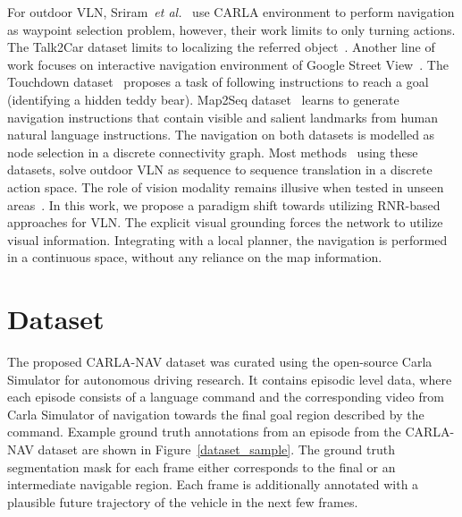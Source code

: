 \documentclass[11pt]{article}
\newcommand{\etal}{\textit{et al.}}
\begin{document}
For outdoor VLN, Sriram~\etal~\cite{sriram2019talk} use CARLA environment to perform navigation as waypoint selection problem, however, their work limits to only turning actions. The Talk2Car dataset limits to localizing the referred object~\cite{deruyttere2019talk2car}. Another line of work focuses on interactive navigation environment of Google Street View~\cite{mirowski2018learning}. The Touchdown dataset~\cite{chen2019touchdown} proposes a task of following instructions to reach a goal (identifying a hidden teddy bear). Map2Seq dataset~\cite{schumann2020generating} learns to generate navigation instructions that contain visible and salient landmarks from human natural language instructions. The navigation on both datasets is modelled as node selection in a discrete connectivity graph. Most methods~\cite{schumann-riezler-2022-analyzing, zhu-etal-2021-multimodal, xiang-etal-2020-learning} using these datasets, solve outdoor VLN as sequence to sequence translation in a discrete action space. The role of vision modality remains illusive when tested in unseen areas~\cite{schumann-riezler-2022-analyzing}. In this work, we propose a paradigm shift towards utilizing RNR-based approaches for VLN. The explicit visual grounding forces the network to utilize visual information. Integrating with a local planner, the navigation is performed in a continuous space, without any reliance on the map information. 
\vspace{-0.2em}

\section{Dataset}

The proposed CARLA-NAV dataset was curated using the open-source Carla Simulator for autonomous driving research. It contains episodic level data, where each episode consists of a language command and the corresponding video from Carla Simulator of navigation towards the final goal region described by the command. Example ground truth annotations from an episode from the CARLA-NAV dataset are shown in Figure~\ref{dataset_sample}. The ground truth segmentation mask for each frame either corresponds to the final or an intermediate navigable region. Each frame is additionally annotated with a plausible future trajectory of the vehicle in the next few frames. 
\end{document}
